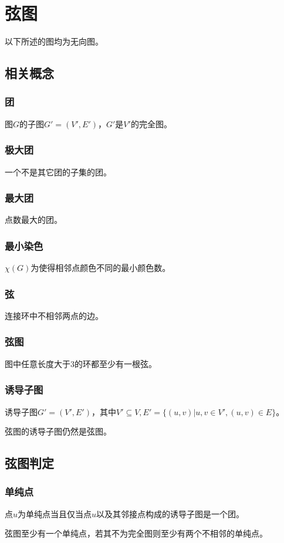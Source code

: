 \section{弦图}
以下所述的图均为无向图。
\subsection{相关概念}
\subsubsection{团}
图$G$的子图$G'=(V',E')$，$G'$是$V'$的完全图。
\subsubsection{极大团}
一个不是其它团的子集的团。
\subsubsection{最大团}
点数最大的团。
\subsubsection{最小染色}
$\chi(G)$为使得相邻点颜色不同的最小颜色数。
\subsubsection{弦}
连接环中不相邻两点的边。
\subsubsection{弦图}
图中任意长度大于3的环都至少有一根弦。
\subsubsection{诱导子图}
诱导子图$G'=(V',E')$，其中$V'\subseteq V,E'=\{(u,v)|u,v\in V',(u,v)\in E\}$。
\begin{lemma}
    弦图的诱导子图仍然是弦图。
\end{lemma}
\subsection{弦图判定}
\subsubsection{单纯点}
点$u$为单纯点当且仅当点$u$以及其邻接点构成的诱导子图是一个团。
\begin{lemma}
    弦图至少有一个单纯点，若其不为完全图则至少有两个不相邻的单纯点。
\end{lemma}
